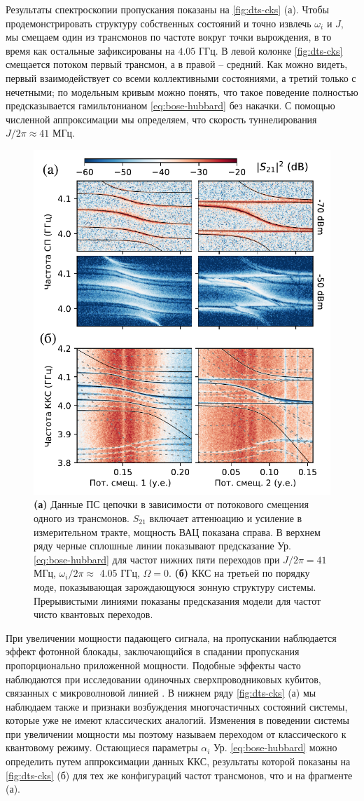 \documentclass[14pt, a4paper]{extarticle}
\begin{document}
Результаты спектроскопии пропускания показаны на \autoref{fig:dts-cks} (а). Чтобы продемонстрировать структуру собственных состояний и точно извлечь $\omega_i$ и $J$, мы смещаем один из трансмонов по частоте вокруг точки вырождения, в то время как остальные зафиксированы на $4.05$ ГГц. В левой колонке \autoref{fig:dts-cks} смещается потоком первый трансмон, а в правой -- средний. Как можно видеть, первый взаимодействует со всеми коллективными состояниями, а третий только с нечетными; по модельным кривым можно понять, что такое поведение полностью предсказывается гамильтонианом \eqref{eq:bose-hubbard} без накачки. С помощью численной аппроксимации мы определяем, что скорость туннелирования $J/2\pi\approx 41$ МГц.
	
	\begin{figure}[t]
		\centering
		\includegraphics[width=0.6\linewidth]{Pictures/DTS-CKS}
		\caption{\textbf{(а)} Данные ПС цепочки в зависимости от потокового смещения одного из трансмонов. $S_{21}$ включает аттенюацию и усиление в измерительном тракте, мощность ВАЦ показана справа. В верхнем ряду черные сплошные линии показывают предсказание Ур. \eqref{eq:bose-hubbard} для частот нижних пяти переходов при $J/2\pi = 41$ МГц, $\omega_i/2\pi \approx$ 4.05 ГГц, $\Omega=0$. \textbf{(б)} ККС на третьей по порядку моде, показывающая зарождающуюся зонную структуру системы. Прерывистыми линиями показаны предсказания модели для частот чисто квантовых переходов.}
		\label{fig:dts-cks}
	\end{figure}

При увеличении мощности падающего сигнала, на пропускании наблюдается эффект фотонной блокады, заключающийся в спадании пропускания пропорционально приложенной мощности. Подобные эффекты часто наблюдаются при исследовании одиночных сверхпроводниковых кубитов, связанных с микроволновой линией . В нижнем ряду \autoref{fig:dts-cks} (а) мы наблюдаем также и признаки возбуждения многочастичных состояний системы, которые уже не имеют классических аналогий. Изменения в поведении системы при увеличении мощности мы поэтому называем переходом от классического к квантовому режиму. Остающиеся параметры $\alpha_i$ Ур. \eqref{eq:bose-hubbard} можно определить путем аппроксимации данных ККС, результаты которой показаны на \autoref{fig:dts-cks} (б) для тех же конфигураций частот трансмонов, что и на фрагменте (а).
\end{document}
